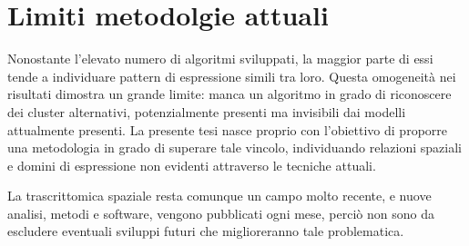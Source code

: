 \section{Limiti metodolgie attuali}\label{sec:cap_five_bioinfo}

Nonostante l'elevato numero di algoritmi sviluppati, 
la maggior parte di essi tende a individuare pattern di espressione simili tra loro\cite{limitiTS}.
Questa omogeneità nei risultati dimostra un grande limite: 
manca un algoritmo in grado di riconoscere dei cluster alternativi, 
potenzialmente presenti ma invisibili dai modelli attualmente presenti.
La presente tesi nasce proprio con l'obiettivo di proporre 
una metodologia in grado di superare tale vincolo, 
individuando relazioni spaziali e domini di espressione non 
evidenti attraverso le tecniche attuali.

\medskip
La trascrittomica spaziale resta comunque un campo molto recente, e nuove analisi, 
metodi e software, vengono pubblicati ogni mese, 
perciò non sono da escludere eventuali sviluppi futuri 
che miglioreranno tale problematica.